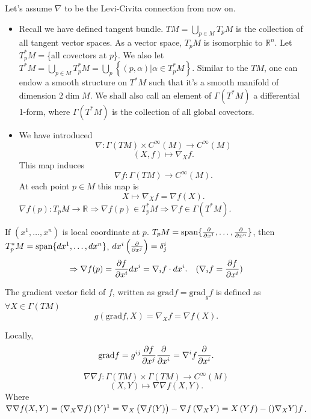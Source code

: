 Let's assume \(\nabla\) to be the Levi-Civita connection from now on.
\begin{itemize}
    \item Recall we have defined tangent bundle. 
    \(TM=\bigcup_{p\in M} T_p M\) is the collection of all 
    tangent vector spaces. As a vector space, \(T_p M\) is isomorphic 
    to \(\mathbb{R}^n\). Let \(T^*_p M=\)\{all covectors at \(p\)\}.
    We also let \(T^*M=\bigcup_{p\in M}T^*_p M=\bigcup_p 
    \left\{(p,\alpha)| \alpha\in T^*_p M\right\}\). Similar to the 
    \(TM\), one can endow a smooth structure on \(T^*M\) such that 
    it's a smooth manifold of dimension \(2\dim M\). We shall also 
    call an element of \(\Gamma(T^* M)\) a differential 1-form, 
    where \(\Gamma(T^*M)\) is the collection of all global covectors.
    \item We have introduced 
    \[
        \nabla \colon \Gamma(TM)\times C^\infty(M)\to C^\infty(M)
    \]
    \[
        (X,f)\mapsto \nabla_X f.    
    \]
    This map induces 
    \[
        \nabla f\colon \Gamma(TM)\to C^\infty(M).
    \]
    At each point \(p\in M\) this map is 
    \[
        X\mapsto \nabla_X f=\nabla f(X).    
    \]
    \(
        \nabla f(p)\colon T_p M\to \mathbb{R}\Rightarrow 
        \nabla f(p)\in T^*_p M\Rightarrow
        \nabla f\in \Gamma(T^* M)
    \).
\end{itemize}
\begin{remark}
    If \((x^1,\ldots, x^n)\) is local coordinate at \(p\). \(T_p M
    =\operatorname{span}\{\pdv{x^1},\ldots,\pdv{x^n}\}\), then \(T^*_p M=\operatorname{span} 
    \{d x^1,\ldots , d x^n\}\), \(dx^i\left(\pdv{x^j}\right)=\delta^i_j\)
    \[
        \Rightarrow \nabla f(p)=\pdv{f}{x^i} (p)dx^i=\nabla_i f\cdot 
        d x^i. \quad (\nabla_i f=\pdv{f}{x^i})    
    \]
\end{remark}
\begin{definition}
    The gradient vector field of \(f\), written as \(\mathrm{grad} f=
    \mathrm{grad}_g f \) is defined as \(\forall X\in \Gamma(TM)\)
    \[
        g(\mathrm{grad} f,X)=\nabla_X f=\nabla f(X).    
    \]
\end{definition}
Locally, 
\[
    \mathrm{grad} f=g^{ij}\pdv{f}{x^j}\pdv{x^i}=\nabla^i f\pdv{x^i}.
\]
\begin{definition}[Hessian of \(f\)]
    \[
        \nabla\nabla f\colon \Gamma(TM)\times \Gamma(TM)\to C^\infty(M)
    \]
    \[
        (X,Y)\mapsto \nabla\nabla f(X,Y).    
    \]
    Where \(\nabla\nabla f(X,Y)=\left(\nabla_X \nabla f\right)(Y)
    \footnotemark
    =\nabla_X
    \left(\nabla f(Y)\right)-\nabla f\left(\nabla_X Y\right)=
    X\left(Y f\right)-()\nabla_X Y) f\).
\end{definition}
